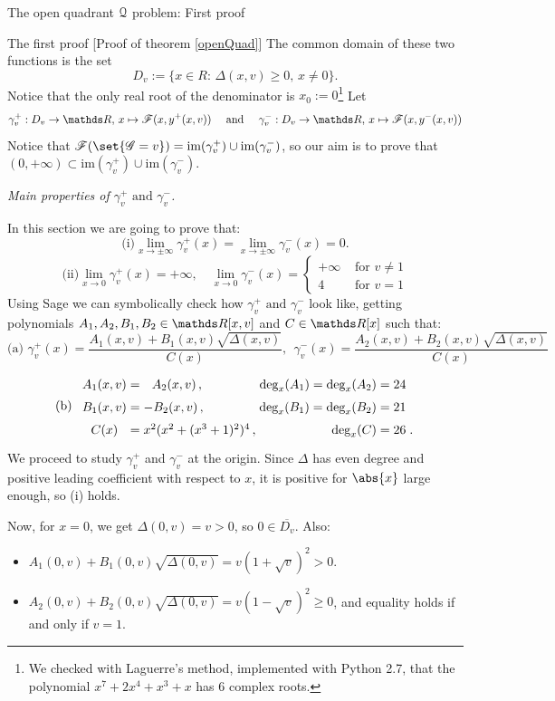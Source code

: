\documentclass[11pt, a4paper, english, twoside, notitlepage, openright]{report}
\begin{document}
\begin{chapter}{The open quadrant $\mathcal{Q}$ problem: First proof}
\begin{section}{The first proof} [Proof of theorem \ref{openQuad}]
The common domain of these two functions is the set 
$$
D_v:=\{x\in R:\, \Delta(x,v)\geq 0,\,x\neq 0\}.
$$ 
Notice that the only real root of the denominator is $x_0:=0$\footnote{We checked with Laguerre's method, implemented with Python 2.7, that the polynomial $x^7+2x^4+x^3+x$ has 6 complex roots.} Let
$$
\gamma_v^+: D_v\to\R,\, x\mapsto\F(x,y^+(x,v))\quad\text{ and }\quad\gamma_v^-:D_v\to\R,\, x\mapsto\F(x,y^-(x,v))
$$
Notice that $\F(\set{\G=v})=\text{im}(\gamma_v^+)\cup\text{im}(\gamma_v^-)$, so our aim is to prove that $(0,+\infty)\subset\text{im}(\gamma_v^+)\cup\text{im}(\gamma_v^-)$.
\begin{center}
 \emph{Main properties of $\gamma_v^+ \text{ and } \gamma_v^-$.}
\end{center}\label{step2}
In this section we are going to prove that:
$$
\text{(i)} \lim_{x\rightarrow \pm\infty}\gamma_v^+(x)=\lim_{x\rightarrow \pm\infty}\gamma_v^-(x)=0.
$$
$$\text{(ii)} \lim_{x\rightarrow 0}\gamma_v^+(x)=+\infty
,\quad \lim_{x\rightarrow 0}\gamma_v^-(x)=\left\{\begin{array}{ll}
+\infty&\text{ for $v\neq 1$}\\
 4 & \text{ for $v=1$}
\end{array} \right.
$$
Using Sage we can symbolically check how $\gamma_v^+\text{ and }\gamma_v^-$ look like, getting polynomials $A_1,A_2,B_1,B_2\in\R[x,v]$ and $C\in \R[x]$ such that:
$$\text{(a) }\gamma_v^+(x)=\dfrac{A_1(x,v)+B_1(x,v)\sqrt{\Delta(x,v)}}{C(x)}, \ \ 
\gamma_v^-(x)=\dfrac{A_2(x,v)+B_2(x,v)\sqrt{\Delta(x,v)}}{C(x)}$$
$$
\text{(b)}\ \ 
\arraycolsep=1.4pt\def\arraystretch{1.5}
\begin{array}{cclrl}
A_1(x,v)&=&\ \ A_2(x,v)\, , & \text{deg}_x(A_1)=\text{deg}_x(A_2)=24& \\
B_1(x,v)&=&-B_2(x,v)\, , &\text{deg}_x(B_1)=\text{deg}_x(B_2)=21& \\
C(x)&=&x^2(x^2+(x^3+1)^2)^4\, , & \text{deg}_x(C)=26&.
\end{array}
$$
We proceed to study $\gamma_v^+$ and $\gamma_v^-$ at the origin. Since $\Delta$ has even degree and positive leading coefficient with respect to $x$, it is positive for $\abs{x}$ large enough, so (i) holds.
			
Now, for $x=0$, we get $\Delta(0,v)=v>0$, so $0\in\overline{D_v}$. Also:
\begin{itemize}
\item $A_1(0,v)+B_1(0,v) \sqrt{\Delta(0,v)}= v(1+\sqrt{v})^2>0$.
				\item $A_2(0,v)+B_2(0,v)\sqrt{\Delta(0,v)}=v(1-\sqrt{v})^2\geq 0$, and equality holds if and only if $v=1$.
\end{itemize}
			

\end{section}
\end{chapter}
\end{document}

